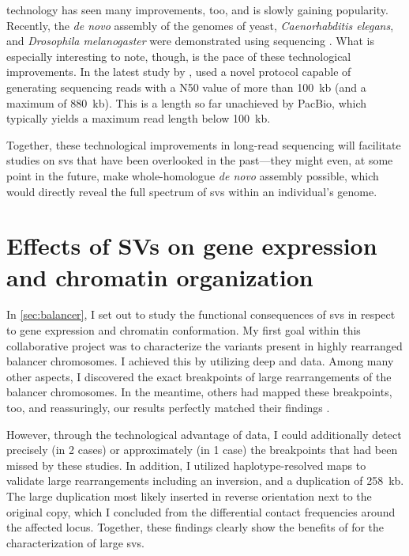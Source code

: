 \ont technology has seen many improvements, too, and is slowly gaining
popularity. Recently, the \textit{de novo} assembly of the genomes of yeast,
\textit{Caenorhabditis elegans}, and \textit{Drosophila melanogaster} were
demonstrated using \ont sequencing \citep{Istace2017,Tyson2017,Solares2018}.
What is especially interesting to note, though, is the pace of these technological
improvements. In the latest study by \ont, \citet{Jain2018} used a novel protocol
capable of generating sequencing reads with a N50 value of more than 100~kb
(and a maximum of 880~kb). This is a length so far unachieved by PacBio, which
typically yields a maximum read length below 100~kb.

Together, these technological improvements in long-read sequencing will facilitate
studies on \acp{sv} that have been overlooked in the past---they might even, at some point in the future,
make whole-homologue \emph{de novo} assembly possible, which would directly reveal the full spectrum
of \acp{sv} within an individual's genome.




\section{Effects of SVs on gene expression and chromatin organization}

In \cref{sec:balancer}, I set out to study the functional consequences of
\acp{sv} in respect to gene expression and chromatin conformation. My first goal
within this collaborative project was to characterize the variants present in
highly rearranged balancer chromosomes. I achieved this by utilizing deep \wgs
and \hic data. Among many other aspects, I discovered the exact breakpoints of
large rearrangements of the balancer chromosomes. In the meantime, others had
mapped these breakpoints, too, and reassuringly, our results perfectly matched
their findings \citep{Miller2016,Miller2018}.

However, through the technological
advantage of \hic data, I could additionally detect precisely (in 2
cases) or approximately (in 1 case) the breakpoints that had been missed by
these studies. In addition, I utilized haplotype-resolved \hic maps to validate
large rearrangements including an inversion, and a duplication of 258~kb. The
large duplication most likely inserted in reverse orientation next to the
original copy, which I concluded from the differential contact frequencies
around the affected locus. Together, these findings clearly show the benefits
of \hic for the characterization of large \acp{sv}.

